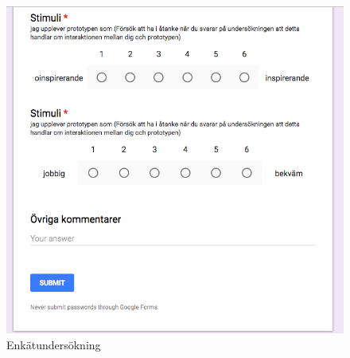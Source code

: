   \begin{figure} [H]
   \centering
   \includegraphics[scale=0.75]{form5.png}
  \captionsetup{justification=centering,margin=2cm}
  \caption{Enkätundersökning}
 \end{figure} 
